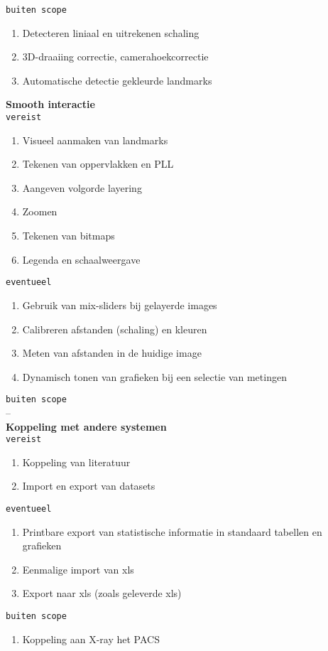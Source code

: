 \verb!buiten scope!
\begin{enumerate}
	\item Detecteren liniaal en uitrekenen schaling
	\item 3D-draaiing correctie, camerahoekcorrectie
	\item Automatische detectie gekleurde landmarks\\
\end{enumerate}
\Large{\textbf{Smooth interactie}}
\\\verb!vereist!
\begin{enumerate}
	\item Visueel aanmaken van landmarks
	\item Tekenen van oppervlakken en PLL
	\item Aangeven volgorde layering
	\item Zoomen
	\item Tekenen van bitmaps
	\item Legenda en schaalweergave
\end{enumerate}
\verb!eventueel!
\begin{enumerate}
	\item Gebruik van mix-sliders bij gelayerde images
	\item Calibreren afstanden (schaling) en kleuren
	\item Meten van afstanden in de huidige image
	\item Dynamisch tonen van grafieken bij een selectie van metingen
\end{enumerate}
\verb!buiten scope!\\
--\\
\Large{\textbf{Koppeling met andere systemen}}
\\\verb!vereist!
\begin{enumerate}
	\item Koppeling van literatuur
	\item Import en export van datasets
\end{enumerate}
\verb!eventueel!
\begin{enumerate}
	\item Printbare export van statistische informatie in standaard tabellen en grafieken
	\item Eenmalige import van xls
	\item Export naar xls (zoals geleverde xls)
\end{enumerate}
\verb!buiten scope!
\begin{enumerate}
	\item Koppeling aan X-ray het PACS
\end{enumerate}
\newpage

